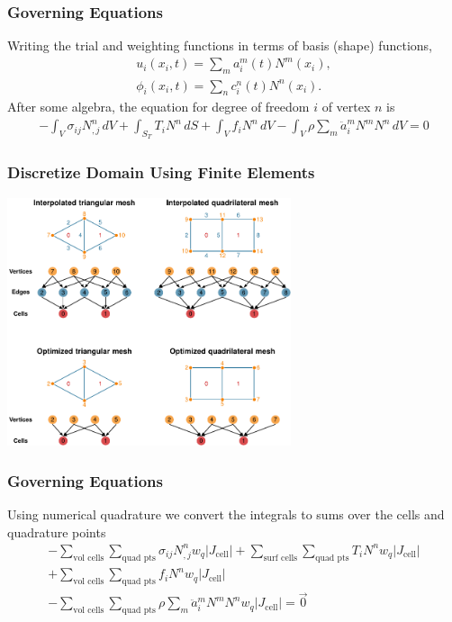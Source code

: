 \documentclass{beamer}
\begin{document}
\begin{frame}
  \frametitle{Governing Equations}
  \summary{}

  \vfill
  Writing the trial and weighting functions in terms of basis (shape)
  functions,
  \begin{gather}
    u_i(x_i, t) = \sum_m a^m_i(t) N^m(x_i), \\
    \phi_i(x_i, t) = \sum_n c^n_i(t) N^n(x_i).
  \end{gather}
  After some algebra, the equation for degree of freedom $i$ of
  vertex $n$ is
  \begin{multline}
    -\int_V \sigma_{ij} N^n_{,j} \, dV 
    + \int_{S_T} T_i N^n \, dS
    + \int_V f_i N^n \, dV 
    - \int_V \rho \sum_m \ddot{a}^m_i N^m N^n \, dV = 0
  \end{multline}
  \vfill

\end{frame}

\begin{frame}
  \frametitle{Discretize Domain Using Finite Elements}
 
   \begin{center}
     \includegraphics[height=7.3cm]{figs/meshtopology}
   \end{center}
   
 \end{frame}
 

\begin{frame}
  \frametitle{Governing Equations}
  \summary{}

  Using numerical quadrature we convert the integrals to sums over the
  cells and quadrature points
  \begin{multline}
    -\sum_\text{vol cells} \sum_\text{quad pts} \sigma_{ij} N^n_{,j} w_q |J_\text{cell}|
    + \sum_\text{surf cells} \sum_\text{quad pts} T_i N^n w_q |J_\text{cell}|\\
    + \sum_\text{vol cells} \sum_\text{quad pts}  f_i N^n w_q |J_\text{cell}|\\
    - \sum_\text{vol cells} \sum_\text{quad pts} \rho \sum_m \ddot{a}^m_i N^m N^n w_q |J_\text{cell}| = \vec{0}    
  \end{multline}

\end{frame}
\end{document}
